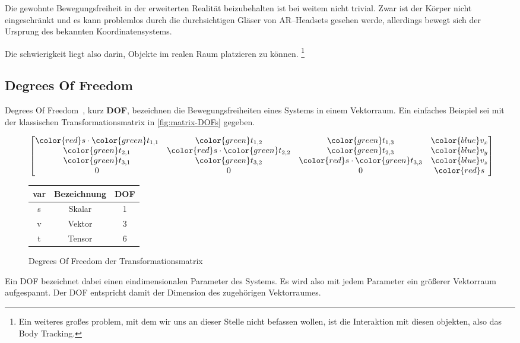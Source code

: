 Die gewohnte Bewegungsfreiheit in der erweiterten Realität beizubehalten ist bei weitem nicht trivial.
Zwar ist der Körper nicht eingeschränkt und es kann problemlos durch die durchsichtigen Gläser von AR--Headsets gesehen werde, allerdings bewegt sich der Ursprung des bekannten Koordinatensystems.

Die schwierigkeit liegt also darin, Objekte im realen Raum platzieren zu können.
\footnote{Ein weiteres großes problem, mit dem wir uns an dieser Stelle nicht befassen wollen, ist die Interaktion mit diesen objekten, also das Body Tracking.}

\subsection{Degrees Of Freedom}\label{subsec:degrees-of-freedom}
    Degrees Of Freedom~\autocite{wikipedia-contributors-2023B}, kurz \textbf{DOF}, bezeichnen die Bewegungsfreiheiten eines Systems in einem Vektorraum.
    Ein einfaches Beispiel sei mit der klassischen Transformationsmatrix in \autoref{fig:matrix-DOFs} gegeben.
    \begin{figure}[ht!]
        \label{fig:matrix-DOFs}
        \begin{center}
            \begin{math}
                \begin{bmatrix}
                {\color{red} s}
                    \cdot {\color{green} t_{1,1}} & {\color{green} t_{1,2}}                       & {\color{green} t_{1,3}}                       & {\color{blue} v_x} \\
                    {\color{green} t_{2,1}}       & {\color{red} s} \cdot {\color{green} t_{2,2}} & {\color{green} t_{2,3}}                       & {\color{blue} v_y} \\
                    {\color{green} t_{3,1}}       & {\color{green} t_{3,2}}                       & {\color{red} s} \cdot {\color{green} t_{3,3}} & {\color{blue} v_z} \\
                    0                             & 0                                             & 0                                             & {\color{red} s}
                \end{bmatrix}
            \end{math}
        \end{center}
        \begin{tabular}{c|c|c}
            var             & Bezeichnung & DOF \\
            \hline
            \color{red} s   & Skalar      & 1   \\
            \color{blue} v  & Vektor      & 3   \\
            \color{green} t & Tensor      & 6   \\
        \end{tabular}
        \caption{Degrees Of Freedom der Transformationsmatrix}
    \end{figure}
    Ein DOF bezeichnet dabei einen eindimensionalen Parameter des Systems.
    Es wird also mit jedem Parameter ein größerer Vektorraum aufgespannt.
    Der DOF entspricht damit der Dimension des zugehörigen Vektorraumes.

